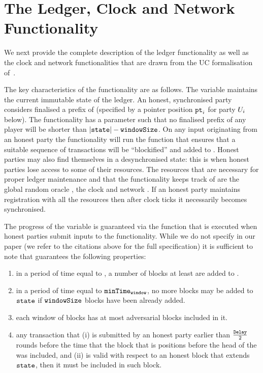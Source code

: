 \section{The Ledger, Clock and Network Functionality}
  \label{appendix:ledger}
  We next provide the complete description of the ledger functionality as well as the clock and network functionalities  that are
drawn from the   UC formalisation of~\cite{BMTZ17,genesis}.

  The key characteristics of the functionality are as follows. The variable
  \state maintains the current immutable state of the ledger. An honest,
  synchronised party considers finalised a prefix of \state (specified by a
  pointer position $\texttt{pt}_{i}$ for party $U_i$ below). The functionality has a
  parameter \windowSize such that no finalised prefix of any player will be
  shorter than $|\texttt{state}| - \texttt{windowSize}$. On any input originating from an honest
  party the functionality will run the \LFextend function that ensures that a
  suitable sequence of transactions will be ``blockified'' and added to \state.
  Honest parties may also find themselves in a desynchronised state: this is
  when honest parties lose access to some of their resources. The resources that
  are necessary for proper ledger maintenance and that the functionality keeps
  track of are the global random oracle \Foracle, the clock \Fclock and network
  \FnetworkEd. If an honest party maintains registration with all the resources
  then after \vdelay clock ticks it necessarily becomes synchronised.

  The progress of the \state variable is guaranteed via the \LFextend function
  that is executed when honest parties submit inputs to the functionality. While
  we do not specify \LFextend in our paper (we refer to the citations above for
  the full specification) it is sufficient to note that \LFextend guarantees the
  following properties:
  \begin{enumerate}
    \item in a period of time equal to \maxTime, a number of blocks at least
    \windowSize are
    added to \state.
    \item in a period of time equal to $\texttt{minTime}_\texttt{window}$, no more blocks may be added to $\texttt{state}$ if $\texttt{windowSize}$ blocks have been already added. 
    \item each window of \windowSize blocks has at most \advBlocksinWindowSize\/
    adversarial blocks included in it.
    \item any transaction that (i) is submitted by an honest party earlier than
    $\frac{\texttt{Delay}}{2}$ rounds before the time that the block that is
    \windowSize positions before the head of the \state was included, 
    and (ii) is valid with respect to an honest block that extends $\texttt{state}$,
    then it must be included in such block. 
  \end{enumerate}

